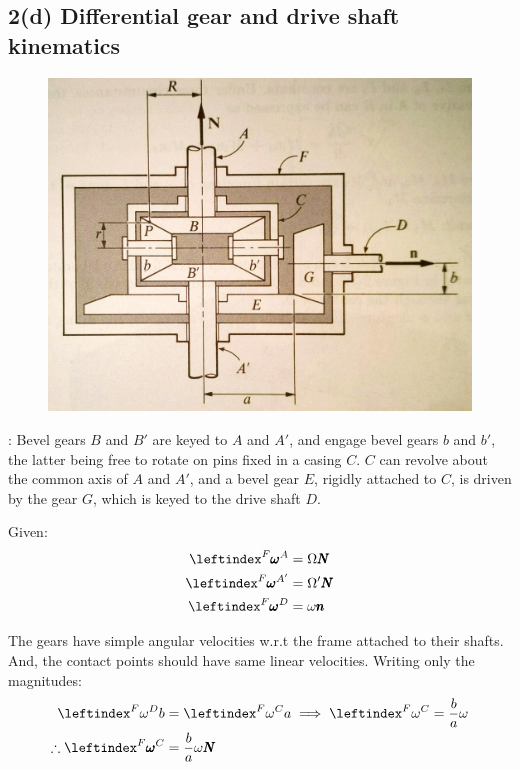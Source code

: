 \subsection{2(d) Differential gear and drive shaft kinematics}
\begin{figure}[H]
    \centering
    \includegraphics[scale = 0.1]{figs/ProbSet_2/2_d.jpg}
    \caption{}
    \label{2_d}
\end{figure}

: Bevel gears $B$ and $B'$ are keyed to $A$ and $A'$, and engage bevel gears $b$ and $b'$, the latter being free to rotate on pins fixed in a casing $C$. $C$ can revolve about the common axis of $A$ and $A'$, and a bevel gear $E$, rigidly attached to $C$, is driven by the gear $G$, which is keyed to the drive shaft $D$.

\bigskip
Given:
\begin{align*}
    \lx{^F}{\pmb \omega}^A &= \Omega \pmb N\\
    \lx{^F}{\pmb \omega}^{A'} &=\Omega' \pmb N\\
    \lx{^F}{\pmb \omega}^D &= \omega \pmb n
\end{align*}

The gears have simple angular velocities w.r.t the frame attached to their shafts. And, the contact points should have same linear velocities. Writing only the magnitudes:
\begin{align*}
    \lx{^F}{\omega}^D b &=  \lx{^F}{\omega}^C a \implies \lx{^F}{\omega}^C  = \frac{b}{a} \omega\\
    \therefore \lx{^F}{\pmb \omega}^C  &= \frac{b}{a} \omega \pmb N\\
\end{align*}

